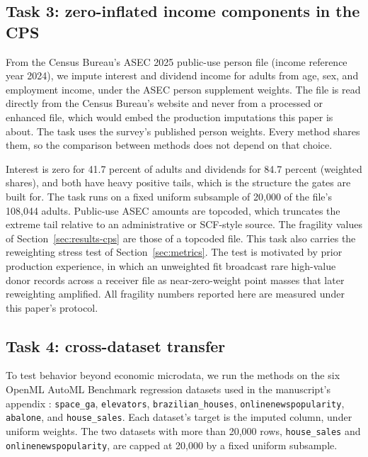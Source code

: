 \subsection{Task 3: zero-inflated income components in the CPS}
\label{sec:task-cps}

From the Census Bureau's ASEC 2025 public-use person file (income reference
year 2024), we impute interest and dividend income for adults from age, sex,
and employment income, under the ASEC person supplement weights. The file is
read directly from the Census Bureau's website and never from a processed or
enhanced file, which would embed the production imputations this paper
is about. The task uses the survey's published person weights. Every method
shares them, so the comparison between methods does not depend on that
choice.

Interest is zero for 41.7 percent of adults and dividends for 84.7 percent
(weighted shares), and both have heavy positive tails, which is the
structure the gates are built for. The task runs on a fixed uniform subsample of 20,000
of the file's 108,044 adults. Public-use ASEC amounts are topcoded, which truncates the
extreme tail relative to an administrative or SCF-style source. The fragility
values of Section~\ref{sec:results-cps} are those of a topcoded file.
This task also carries the reweighting stress test of
Section~\ref{sec:metrics}. The test is motivated by prior \policyengine{}
production experience, in which an unweighted fit broadcast rare high-value
donor records across a receiver file as near-zero-weight point masses that
later reweighting amplified. All fragility numbers reported here are
measured under this paper's protocol.

\subsection{Task 4: cross-dataset transfer}
\label{sec:task-openml}

To test behavior beyond economic microdata, we run the methods on
the six OpenML AutoML Benchmark regression datasets used in the
\microimpute{} manuscript's appendix \citep{vanschoren2014openml}:
\texttt{space\_ga}, \texttt{elevators}, \texttt{brazilian\_houses},
\texttt{onlinenewspopularity}, \texttt{abalone}, and \texttt{house\_sales}.
Each dataset's target is the imputed column, under uniform weights. The two
datasets with more than 20,000 rows, \texttt{house\_sales}
and \texttt{onlinenewspopularity}, are capped at 20,000 by a fixed uniform
subsample.